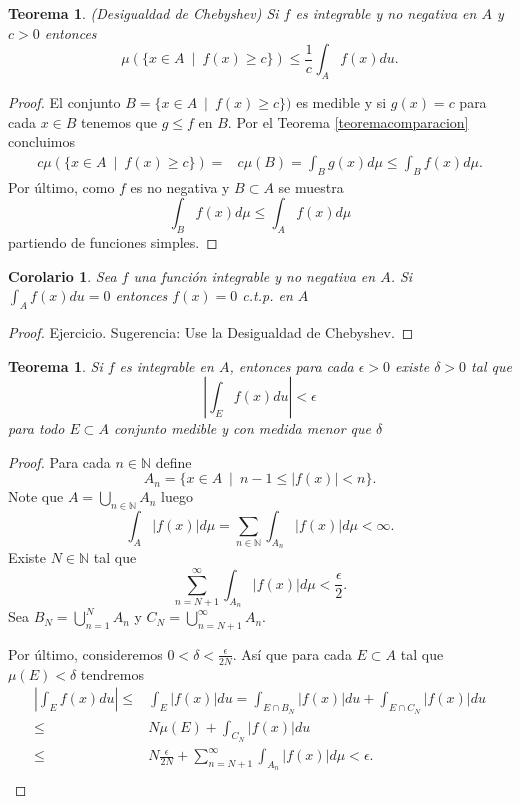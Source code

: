 \documentclass[twoside,12pt,a4 paper,openright]{book}
\newtheorem{teo}[claim]{Teorema}
\newtheorem{cor}[claim]{Corolario}
\begin{document}
\begin{teo}
    (Desigualdad de Chebyshev) Si $f$ es integrable y no negativa en $A$ y $c>0$ entonces\\
    $$\mu(\{   x\in A \ \mid \  f(x) \geq c\})\leq \frac{1}{c}\int_A f(x) du.$$
\end{teo}
\begin{proof}
El conjunto $B =  \{x\in A \ \mid \  f(x) \geq c\})$ es medible  y si $g(x)=c$ para cada $x\in B$ tenemos que
$g\leq f$ en $B$. Por el Teorema \ref{teoremacomparacion} concluimos 
\begin{align*}
 c\mu(\{   x\in A \ \mid \  f(x) \geq c\})  =  & c\mu(B)=  \int_B g(x)d\mu  \leq \int_B f (x)d\mu.  
 \end{align*}
 Por \'ultimo, como $f $ es no negativa y $B\subset A$ se muestra 
 $$\int_B f (x)d\mu\leq \int_A f (x)d\mu $$
 partiendo de funciones simples.
 
\end{proof}




\begin{cor}
Sea $f$ una funci\'on integrable y no negativa en $A$.   Si $\displaystyle\int_Af(x)du = 0$ entonces $f(x) = 0$ c.t.p. en $A$
\end{cor}
\begin{proof}
    Ejercicio. 
    Sugerencia: Use la Desigualdad de Chebyshev.
     \end{proof}




\begin{teo}
    Si $f$ es integrable en $A$, entonces para cada $\epsilon> 0$ existe $\delta>0$ tal que 
    $$\left|\int_Ef(x) du\right|<\epsilon$$
    para todo $E\subset A$ conjunto medible y con medida menor que $\delta$
\end{teo}
\begin{proof}
 Para cada $n\in \mathbb N$ define 
 $$A_n =\{  x\in A \ \mid \ n-1 \leq  |f(x)|< n \}.$$ 
Note que $A=\bigcup_{n\in\mathbb N}A_n$ luego 
$$\int_A |f(x)| d\mu = \sum_{n\in\mathbb N}  \int_{A_n} |f(x)| d\mu <\infty.$$
Existe $N\in \mathbb N$ tal que $$\sum_{n= N+1 }^{\infty }  \int_{A_n} |f(x)| d\mu<\frac{\epsilon}{2}. $$
Sea $B_N =\bigcup_{n=1}^N A_n$ y $C_N =\bigcup_{n=N+1}^{\infty} A_n $. 


Por \'ultimo, consideremos $0<\delta<\frac{\epsilon}{2N}$. As\'i que para cada $E \subset A$ tal que $\mu(E) <\delta$ tendremos 
    \begin{align*} 
    \left|\int_E f(x) du\right|\leq  &  \int_E   \left|  f(x)  \right| du  =  \int_{E\cap B_N}   \left|  f(x)  \right| du + \int_{E\cap C_N }  \left|  f(x)  \right| du \\
    \leq  &   N \mu (E) + \int_{C_N}   \left|  f(x)  \right| du \\
    \leq &   N \frac{\epsilon}{2N} +    \sum_{n= N+1 }^{\infty }  \int_{A_n} |f(x)| d\mu< \epsilon.\\
        \end{align*}
 \end{proof}
 
\end{document}
